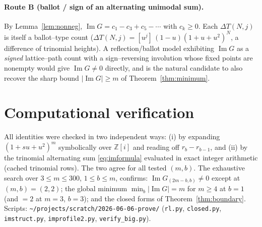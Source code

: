 \documentclass[11pt]{article}
\theoremstyle{definition}
\newcommand{\Zb}{\mathbb{Z}}
\renewcommand{\Im}{\operatorname{Im}}
\newcommand{\im}{\Im}
\begin{document}
\paragraph{Route B (ballot / sign of an alternating unimodal sum).}
By Lemma~\ref{lem:nonneg}, $\im G=c_1-c_3+c_5-\cdots$ with $c_k\ge0$.  Each
$\Delta T(N,j)$ is itself a ballot--type count
($\Delta T(N,j)=[u^j]\,(1-u)(1+u+u^2)^N$, a difference of trinomial heights).
A reflection/ballot model exhibiting $\im G$ as a \emph{signed} lattice--path
count with a sign--reversing involution whose fixed points are nonempty would give
$\im G\neq0$ directly, and is the natural candidate to also recover the sharp
bound $|\im G|\ge m$ of Theorem~\ref{thm:minimum}.

\section{Computational verification}\label{sec:comp}

All identities were checked in two independent ways: (i) by expanding
$(1+su+u^2)^m$ symbolically over $\Zb[i]$ and reading off $r_b-r_{b-1}$, and (ii)
by the trinomial alternating sum \eqref{eq:imformula} evaluated in exact integer
arithmetic (cached trinomial rows).  The two agree for all tested $(m,b)$.
The exhaustive search over $3\le m\le300$, $1\le b\le m$, confirms:
$\im G_{(2m-b,b)}\neq0$ except at $(m,b)=(2,2)$; the global minimum
$\min_b|\im G|=m$ for $m\ge4$ at $b=1$ (and $=2$ at $m=3$, $b=3$); and the
closed forms of Theorem~\ref{thm:boundary}.  Scripts:
\texttt{\~{}/projects/scratch/2026-06-06-prove/} (\texttt{rl.py}, \texttt{closed.py},
\texttt{imstruct.py}, \texttt{improfile2.py}, \texttt{verify\_big.py}).
\end{document}
